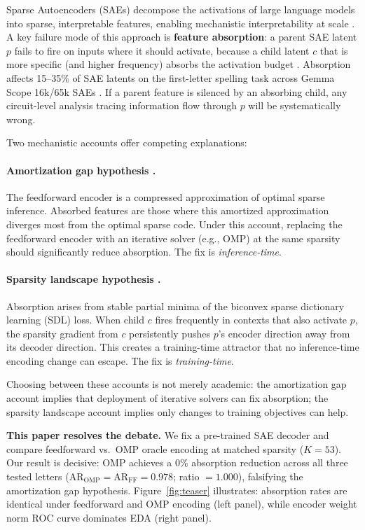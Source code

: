 \documentclass{article}
\begin{document}
Sparse Autoencoders (SAEs) decompose the activations of large language models into sparse,
interpretable features, enabling mechanistic interpretability at scale
\citep{bricken2023monosemanticity, cunningham2023sparse}. A key failure mode of this approach
is \textbf{feature absorption}: a parent SAE latent $p$ fails to fire on inputs where it
should activate, because a child latent $c$ that is more specific (and higher frequency)
absorbs the activation budget \citep{chanin2024absorption}. Absorption affects 15--35\% of
SAE latents on the first-letter spelling task across Gemma Scope 16k/65k SAEs
\citep{karvonen2025saebench}. If a parent feature is silenced by an absorbing child, any
circuit-level analysis tracing information flow through $p$ will be systematically wrong.

Two mechanistic accounts offer competing explanations:

\paragraph{Amortization gap hypothesis \citep{oneill2024amortization}.} The feedforward
encoder is a compressed approximation of optimal sparse inference. Absorbed features are those
where this amortized approximation diverges most from the optimal sparse code. Under this
account, replacing the feedforward encoder with an iterative solver (e.g., OMP) at the same
sparsity should significantly reduce absorption. The fix is \emph{inference-time}.

\paragraph{Sparsity landscape hypothesis \citep{tang2024unified}.} Absorption arises from
stable partial minima of the biconvex sparse dictionary learning (SDL) loss. When child $c$
fires frequently in contexts that also activate $p$, the sparsity gradient from $c$
persistently pushes $p$'s encoder direction away from its decoder direction. This creates a
training-time attractor that no inference-time encoding change can escape. The fix is
\emph{training-time}.

Choosing between these accounts is not merely academic: the amortization gap account implies
that deployment of iterative solvers can fix absorption; the sparsity landscape account implies
only changes to training objectives can help.

\textbf{This paper resolves the debate.} We fix a pre-trained SAE decoder and compare
feedforward vs.\ OMP oracle encoding at matched sparsity ($K=53$). Our result is decisive:
OMP achieves a 0\% absorption reduction across all three tested letters
($\mathrm{AR}_\mathrm{OMP} = \mathrm{AR}_\mathrm{FF} = 0.978$; ratio $= 1.000$), falsifying
the amortization gap hypothesis. Figure~\ref{fig:teaser} illustrates: absorption rates are
identical under feedforward and OMP encoding (left panel), while encoder weight norm ROC curve
dominates EDA (right panel).
\end{document}

